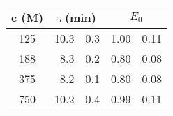 \begin{tabular}{cr@{$\,\pm\,$}lr@{$\,\pm\,$}l}
\toprule
c (\g{m}M)
     & \multicolumn{2}{c}{$\tau$\,(min)}
                  & \multicolumn{2}{c}{$E_0$} \\
\midrule

 125 & 10.3 & 0.3 &  1.00 & 0.11 \\
 188 &  8.3 & 0.2 &  0.80 & 0.08 \\
 375 &  8.2 & 0.1 &  0.80 & 0.08 \\
 750 & 10.2 & 0.4 &  0.99 & 0.11 \\
\bottomrule
\end{tabular}
